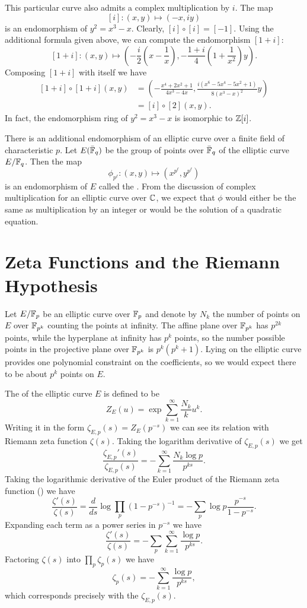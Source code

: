 This particular curve also admits a complex multiplication by $i$.
The map 
\[
[i] : (x, y) \mapsto (-x, iy)
\]
is an endomorphism of $y^2 = x^3 -x$.  Clearly, $[i] \circ [i] =
[-1]$.  Using the additional formula given above, we can compute the
endomorphism $[1+i]$:
\[
[1+i] : (x, y) \mapsto \left(-\frac{i}{2}\left(x - \frac{1}{x}\right),
  -\frac{1+i}{4}\left(1 + \frac{1}{x^2}\right) y\right).
\]
Composing $[1+i]$ with itself we have
\[
\begin{aligned}
[1+i]\circ[1+i](x,y) & = \left(
-\frac{x^4+2x^2+1}{4x^3-4x}, \frac{i(x^6-5x^4-5x^2+1)}{8(x^3-x)^2}y\right)\\
& = [i] \circ [2] (x,y).
\end{aligned}
\]
In fact, the endomorphism ring of $y^2=x^3-x$ is isomorphic to $\mathbb{Z}[i]$.

\medskip
There is an additional endomorphism of an elliptic curve over a
finite field of characteristic $p$.  Let $E(\bar{\mathbb{F}}_q)$ be the group
of points over $\bar{\mathbb{F}}_q$ of the elliptic curve $E/\mathbb{F}_q$.  Then the map
\[
\phi_{p^{\ell}} : (x, y) \mapsto (x^{p^{\ell}}, y^{p^{\ell}})
\]
is an endomorphism of $E$ called the .  From
the discussion of complex multiplication for an elliptic curve over
$\mathbb{C}$, we expect that $\phi$ would either be the same as multiplication
by an integer or would be the solution of a quadratic equation.

\section{Zeta Functions and the Riemann Hypothesis}
\label{Elliptic:Zeta:Sec}

Let $E/\mathbb{F}_p$ be an elliptic curve over $\mathbb{F}_p$ and denote by $N_k$ the
number of points on $E$ over $\mathbb{F}_{p^k}$ counting the points at
infinity.  The affine plane over $\mathbb{F}_{p^k}$ has $p^{2k}$ points, while
the hyperplane at infinity has $p^k$ points, so the number possible
points in the projective plane over $\mathbb{F}_{p^k}$ is $p^k(p^k+1)$.  Lying
on the elliptic curve provides one polynomial constraint on the
coefficients, so we would expect there to be about $p^k$ points on
$E$.

The  of the elliptic curve $E$ is defined to be 
\[
Z_E(u) = \exp \sum_{k=1}^{\infty} \frac{N_k}{k} u^k .
\]
Writing it in the form $\zeta_{E,p}(s) = Z_E(p^{-s})$ we can see its
relation with Riemann zeta function $\zeta(s)$.  Taking the logarithm
derivative of $\zeta_{E,p}(s)$ we get
\[
\frac{\zeta_{E,p}'(s)}{\zeta_{E,p}(s)} =
- \sum_{k=1}^{\infty} \frac{N_k \log p}{p^{ks}}.
\]
Taking the logarithmic derivative of the Euler product of the Riemann
zeta function () we have
\[
 \frac{\zeta'(s)}{\zeta(s)} 
     = \frac{d}{ds} \log \prod_p \left(1 - p^{-s}\right)^{-1}
     = -\sum_p \log p \frac{p^{-s}}{1 - p^{-s}}.
\]
Expanding each term as a power series in $p^{-s}$ we have
\[
\frac{\zeta'(s)}{\zeta(s)} 
  = - \sum_p \sum_{k=1}^{\infty} \frac{\log p}{p^{ks}}.
\]
Factoring $\zeta(s)$ into $\prod_p \zeta_p(s)$ we have
\[
\zeta_p(s) = - \sum_{k=1}^{\infty} \frac{\log p}{p^{ks}},
\]
which corresponds precisely with the $\zeta_{E,p}(s)$.

